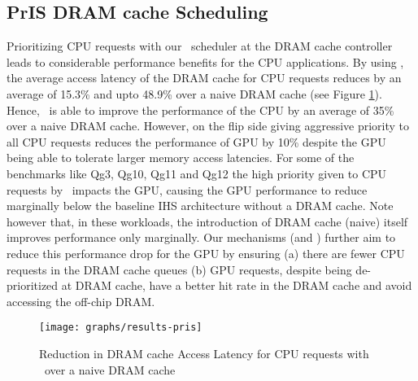 \subsection{PrIS DRAM cache Scheduling}
Prioritizing CPU requests with our \prioname\ scheduler at the DRAM cache controller leads to considerable performance benefits for the CPU applications. By using \prioname, the average access latency of the DRAM cache for CPU requests reduces by an average of 15.3\% and upto 48.9\% over a naive DRAM cache (see Figure \ref{results-pris}). Hence, \prioname\ is able to improve the performance of the CPU by an average of 35\% over a naive DRAM cache. However, on the flip side giving aggressive priority to all CPU requests reduces the performance of GPU by 10\% despite the GPU being able to tolerate larger memory access latencies. For some of the benchmarks like Qg3, Qg10, Qg11 and Qg12 the high priority given to CPU requests by \prioname\ impacts the GPU, causing the GPU performance to reduce marginally below the baseline IHS architecture without a DRAM cache. Note however that, in these workloads, the introduction of DRAM cache (naive) itself improves performance only marginally. Our mechanisms (\bypassname and \chaining) further aim to reduce this performance drop for the GPU by ensuring (a) there are fewer CPU requests in the DRAM cache queues (b) GPU requests, despite being de-prioritized at DRAM cache, have a better hit rate in the DRAM cache and avoid accessing the off-chip DRAM.

\begin{figure}[htb]
	\centering
	\texttt{[image: graphs/results-pris]}
	\caption{Reduction in DRAM cache Access Latency for CPU requests with \prioname\ over a naive DRAM cache}
	\label{results-pris}
\end{figure}

